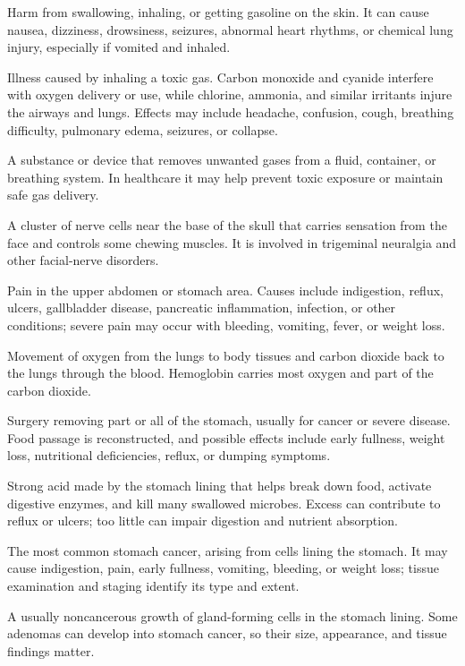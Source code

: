  Harm from swallowing, inhaling, or getting gasoline on the skin. It can cause nausea, dizziness, drowsiness, seizures, abnormal heart rhythms, or chemical lung injury, especially if vomited and inhaled.

 Illness caused by inhaling a toxic gas. Carbon monoxide and cyanide interfere with oxygen delivery or use, while chlorine, ammonia, and similar irritants injure the airways and lungs. Effects may include headache, confusion, cough, breathing difficulty, pulmonary edema, seizures, or collapse.

 A substance or device that removes unwanted gases from a fluid, container, or breathing system. In healthcare it may help prevent toxic exposure or maintain safe gas delivery.

 A cluster of nerve cells near the base of the skull that carries sensation from the face and controls some chewing muscles. It is involved in trigeminal neuralgia and other facial-nerve disorders.

 Pain in the upper abdomen or stomach area. Causes include indigestion, reflux, ulcers, gallbladder disease, pancreatic inflammation, infection, or other conditions; severe pain may occur with bleeding, vomiting, fever, or weight loss.

 Movement of oxygen from the lungs to body tissues and carbon dioxide back to the lungs through the blood. Hemoglobin carries most oxygen and part of the carbon dioxide.

 Surgery removing part or all of the stomach, usually for cancer or severe disease. Food passage is reconstructed, and possible effects include early fullness, weight loss, nutritional deficiencies, reflux, or dumping symptoms.

 Strong acid made by the stomach lining that helps break down food, activate digestive enzymes, and kill many swallowed microbes. Excess can contribute to reflux or ulcers; too little can impair digestion and nutrient absorption.

 The most common stomach cancer, arising from cells lining the stomach. It may cause indigestion, pain, early fullness, vomiting, bleeding, or weight loss; tissue examination and staging identify its type and extent.

 A usually noncancerous growth of gland-forming cells in the stomach lining. Some adenomas can develop into stomach cancer, so their size, appearance, and tissue findings matter.

